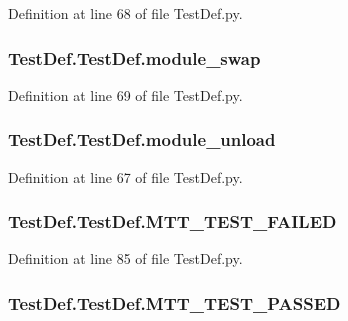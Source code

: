 Definition at line 68 of file Test\-Def.\-py.

\hypertarget{class_test_def_1_1_test_def_a7573371e9c4ccc1713439a63a5ccc64f}{
\subsubsection[{module\-\_\-swap}]{\setlength{\rightskip}{0pt plus 5cm}Test\-Def.\-Test\-Def.\-module\-\_\-swap}}\label{class_test_def_1_1_test_def_a7573371e9c4ccc1713439a63a5ccc64f}


Definition at line 69 of file Test\-Def.\-py.

\hypertarget{class_test_def_1_1_test_def_aba7b969431e50773d10f1384ae2149ab}{
\subsubsection[{module\-\_\-unload}]{\setlength{\rightskip}{0pt plus 5cm}Test\-Def.\-Test\-Def.\-module\-\_\-unload}}\label{class_test_def_1_1_test_def_aba7b969431e50773d10f1384ae2149ab}


Definition at line 67 of file Test\-Def.\-py.

\hypertarget{class_test_def_1_1_test_def_a47c6e8d1d927ec3c05ec7b8f1db538ee}{
\subsubsection[{M\-T\-T\-\_\-\-T\-E\-S\-T\-\_\-\-F\-A\-I\-L\-E\-D}]{\setlength{\rightskip}{0pt plus 5cm}Test\-Def.\-Test\-Def.\-M\-T\-T\-\_\-\-T\-E\-S\-T\-\_\-\-F\-A\-I\-L\-E\-D}}\label{class_test_def_1_1_test_def_a47c6e8d1d927ec3c05ec7b8f1db538ee}


Definition at line 85 of file Test\-Def.\-py.

\hypertarget{class_test_def_1_1_test_def_a142b9283c41740c727811f9c6cf9a6a4}{
\subsubsection[{M\-T\-T\-\_\-\-T\-E\-S\-T\-\_\-\-P\-A\-S\-S\-E\-D}]{\setlength{\rightskip}{0pt plus 5cm}Test\-Def.\-Test\-Def.\-M\-T\-T\-\_\-\-T\-E\-S\-T\-\_\-\-P\-A\-S\-S\-E\-D}}\label{class_test_def_1_1_test_def_a142b9283c41740c727811f9c6cf9a6a4}


